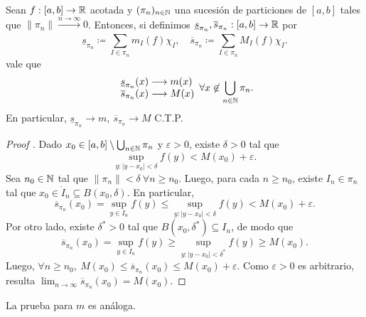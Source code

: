 \begin{lemma}
	Sean $f : [a,b] \to \mathbb{R}$ acotada y $(\pi_{n})_{n\in\mathbb{N}}$ una sucesión de particiones de $[a,b]$ tales que $\| \pi_{n} \| \stackrel{n \to \infty}{\longrightarrow} 0$. Entonces, si definimos $\underline{s}_{\pi_{n}}, \overline{s}_{\pi_{n}} : [a,b] \to \mathbb{R}$ por
	\[ \underline{s}_{\pi_{n}} \coloneq \sum_{I \in \pi_{n}}^{} m_{I}(f) \chi_{I}, \quad \overline{s}_{\pi_{n}} \coloneq \sum_{I \in \pi_{n}}^{} M_{I}(f) \chi_{I}. \]
	vale que 
	\[ \begin{array}{l}
		\underline{s}_{\pi_{n}}(x) \longrightarrow m(x) \\
		\overline{s}_{\pi_{n}}(x) \longrightarrow M(x)
	\end{array} \forall x \not\in \bigcup_{n\in\mathbb{N}} \pi_{n}. \]
	En particular, $\underline{s}_{\pi_{n}} \longrightarrow m,\ \overline{s}_{\pi_{n}} \longrightarrow M$ C.T.P.
\end{lemma}
\begin{proof}[Proof ]
	Dado $x_{0} \in [a,b] \setminus \bigcup_{n\in\mathbb{N}} \pi_{n}$ y $\varepsilon > 0$, existe $\delta > 0$ tal que
	\[ \sup_{y : |y-x_{0}| < \delta} f(y) < M(x_{0}) + \varepsilon. \]
	Sea $n_{0} \in \mathbb{N}$ tal que $\| \pi_{n} \| < \delta \ \forall n \geq n_{0}$. Luego, para cada $n \geq n_{0}$, existe $I_{n} \in \pi_{n}$ tal que $x_{0} \in \mathring{I}_{n} \subseteq B(x_{0},\delta)$. En particular,
	\[ \overline{s}_{\pi_{n}}(x_{0}) = \sup_{y \in I_{n}} f(y) \leq \sup_{y : |y-x_{0}| < \delta} f(y) < M(x_{0}) + \varepsilon. \]
	Por otro lado, existe $\delta^{*} > 0$ tal que $B(x_{0},\delta^{*}) \subseteq I_{n}$, de modo que
	\[ \overline{s}_{\pi_{n}}(x_{0}) = \sup_{y \in I_{n}} f(y) \geq \sup_{y : |y-x_{0}| < \delta^{*}} f(y) \geq M(x_{0}). \]
	Luego, $\forall n \geq n_{0},\ M(x_{0}) \leq \overline{s}_{\pi_{n}}(x_{0}) \leq M(x_{0}) + \varepsilon$. Como $\varepsilon > 0$ es arbitrario, resulta $\lim_{n \to \infty} \overline{s}_{\pi_{n}}(x_{0}) = M(x_{0})$.
\end{proof}

\begin{note}
	La prueba para $m$ es análoga.
\end{note}

